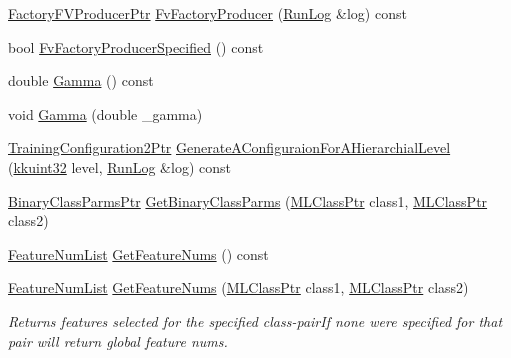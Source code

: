 \begin{DoxyCompactItemize}
\item 
\hyperlink{namespace_k_k_m_l_l_a82812d1feb85a6cff72d059bc67bb90e}{Factory\+F\+V\+Producer\+Ptr} \hyperlink{class_k_k_m_l_l_1_1_training_configuration2_ad6811462fc7d1000552e4e6084d5a67d}{Fv\+Factory\+Producer} (\hyperlink{class_k_k_b_1_1_run_log}{Run\+Log} \&log) const 
\item 
bool \hyperlink{class_k_k_m_l_l_1_1_training_configuration2_a8a59aa376a0f22fc214fd09a6c28e71e}{Fv\+Factory\+Producer\+Specified} () const 
\item 
double \hyperlink{class_k_k_m_l_l_1_1_training_configuration2_a4fbba23963e22735ee0745111d204c4b}{Gamma} () const 
\item 
void \hyperlink{class_k_k_m_l_l_1_1_training_configuration2_a5fc5a4d7e2dc953db4f5f49171689c0f}{Gamma} (double \+\_\+gamma)
\item 
\hyperlink{class_k_k_m_l_l_1_1_training_configuration2_a16dd529d03718630f6f58f572e9535f8}{Training\+Configuration2\+Ptr} \hyperlink{class_k_k_m_l_l_1_1_training_configuration2_a7adabe288c82c63498231eec9769b8cb}{Generate\+A\+Configuraion\+For\+A\+Hierarchial\+Level} (\hyperlink{namespace_k_k_b_af8d832f05c54994a1cce25bd5743e19a}{kkuint32} level, \hyperlink{class_k_k_b_1_1_run_log}{Run\+Log} \&log) const 
\item 
\hyperlink{namespace_k_k_m_l_l_aca399c0744e11553270ffaca507cfee7}{Binary\+Class\+Parms\+Ptr} \hyperlink{class_k_k_m_l_l_1_1_training_configuration2_a433507845863c23e9ef255d1b550c7da}{Get\+Binary\+Class\+Parms} (\hyperlink{namespace_k_k_m_l_l_ac272393853d59e72e8456f14cd6d8c23}{M\+L\+Class\+Ptr} class1, \hyperlink{namespace_k_k_m_l_l_ac272393853d59e72e8456f14cd6d8c23}{M\+L\+Class\+Ptr} class2)
\item 
\hyperlink{class_k_k_m_l_l_1_1_feature_num_list}{Feature\+Num\+List} \hyperlink{class_k_k_m_l_l_1_1_training_configuration2_a4e82b7fbd7ffe0f8cf4b9a76c94b02f8}{Get\+Feature\+Nums} () const 
\item 
\hyperlink{class_k_k_m_l_l_1_1_feature_num_list}{Feature\+Num\+List} \hyperlink{class_k_k_m_l_l_1_1_training_configuration2_aaa05f85b3ae759d5e3dd82d5db2a96f1}{Get\+Feature\+Nums} (\hyperlink{namespace_k_k_m_l_l_ac272393853d59e72e8456f14cd6d8c23}{M\+L\+Class\+Ptr} class1, \hyperlink{namespace_k_k_m_l_l_ac272393853d59e72e8456f14cd6d8c23}{M\+L\+Class\+Ptr} class2)
\begin{DoxyCompactList}\small\item\em Returns features selected for the specified class-\/pair\+If none were specified for that pair will return global feature nums. \end{DoxyCompactList}\item 

\end{DoxyCompactItemize}
